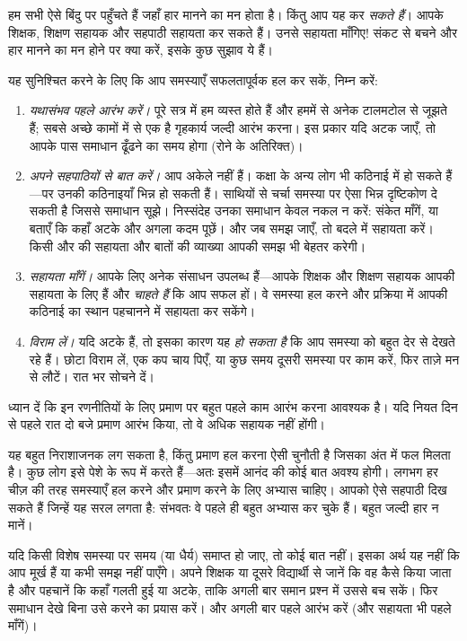 \documentclass[../../../include/open-logic-section]{subfiles}
\begin{document}


हम सभी ऐसे बिंदु पर पहुँचते हैं जहाँ हार मानने का मन होता है। किंतु आप यह
कर \emph{सकते हैं}। आपके शिक्षक, शिक्षण सहायक और सहपाठी सहायता कर सकते हैं।
उनसे सहायता माँगिए!{} संकट से बचने और हार मानने का मन होने पर क्या करें,
इसके कुछ सुझाव ये हैं।

यह सुनिश्चित करने के लिए कि आप समस्याएँ सफलतापूर्वक हल कर सकें, निम्न करें:
\begin{enumerate}
\item \emph{यथासंभव पहले आरंभ करें।} पूरे सत्र में हम व्यस्त होते हैं और
  हममें से अनेक टालमटोल से जूझते हैं; सबसे अच्छे कामों में से एक है गृहकार्य
  जल्दी आरंभ करना। इस प्रकार यदि अटक जाएँ, तो आपके पास समाधान ढूँढने का समय
  होगा (रोने के अतिरिक्त)।
\item \emph{अपने सहपाठियों से बात करें।} आप अकेले नहीं हैं। कक्षा के अन्य
  लोग भी कठिनाई में हो सकते हैं---पर उनकी कठिनाइयाँ भिन्न हो सकती हैं।
  साथियों से चर्चा समस्या पर ऐसा भिन्न दृष्टिकोण दे सकती है जिससे समाधान
  सूझे। निस्संदेह उनका समाधान केवल नकल न करें: संकेत माँगें, या बताएँ कि कहाँ
  अटके और अगला कदम पूछें। और जब समझ जाएँ, तो बदले में सहायता करें। किसी और
  की सहायता और बातों की व्याख्या आपकी समझ भी बेहतर करेगी।
\item \emph{सहायता माँगें।} आपके लिए अनेक संसाधन उपलब्ध हैं---आपके शिक्षक
  और शिक्षण सहायक आपकी सहायता के लिए हैं और \emph{चाहते हैं} कि आप सफल हों।
  वे समस्या हल करने और प्रक्रिया में आपकी कठिनाई का स्थान पहचानने में
  सहायता कर सकेंगे।
\item \emph{विराम लें।} यदि अटके हैं, तो इसका कारण यह \emph{हो सकता है} कि
  आप समस्या को बहुत देर से देखते रहे हैं। छोटा विराम लें, एक कप चाय पिएँ,
  या कुछ समय दूसरी समस्या पर काम करें, फिर ताज़े मन से लौटें। रात भर सोचने
  दें।
\end{enumerate}

ध्यान दें कि इन रणनीतियों के लिए प्रमाण पर बहुत पहले काम आरंभ करना आवश्यक
है। यदि नियत दिन से पहले रात दो बजे प्रमाण आरंभ किया, तो वे अधिक सहायक नहीं
होंगी।

यह बहुत निराशाजनक लग सकता है, किंतु प्रमाण हल करना ऐसी चुनौती है जिसका अंत
में फल मिलता है। कुछ लोग इसे पेशे के रूप में करते हैं---अतः इसमें आनंद की
कोई बात अवश्य होगी। लगभग हर चीज़ की तरह समस्याएँ हल करने और प्रमाण करने के
लिए अभ्यास चाहिए। आपको ऐसे सहपाठी दिख सकते हैं जिन्हें यह सरल लगता है:
संभवतः वे पहले ही बहुत अभ्यास कर चुके हैं। बहुत जल्दी हार न मानें।

यदि किसी विशेष समस्या पर समय (या धैर्य) समाप्त हो जाए, तो कोई बात नहीं।
इसका अर्थ यह नहीं कि आप मूर्ख हैं या कभी समझ नहीं पाएँगे। अपने शिक्षक या
दूसरे विद्यार्थी से जानें कि वह कैसे किया जाता है और पहचानें कि कहाँ गलती
हुई या अटके, ताकि अगली बार समान प्रश्न में उससे बच सकें। फिर समाधान देखे
बिना उसे करने का प्रयास करें। और अगली बार पहले आरंभ करें (और सहायता भी पहले
माँगें)।
\end{document}
